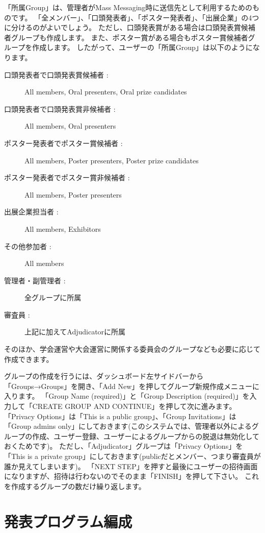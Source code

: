 \documentclass[titlepage,10pt,a4paper,uplatex]{jsbook}
\begin{document}
「所属Group」は、管理者がMass Messaging時に送信先として利用するためのものです。
「全メンバー」、「口頭発表者」、「ポスター発表者」、「出展企業」の4つに分けるのがよいでしょう。
ただし、口頭発表賞がある場合は口頭発表賞候補者グループも作成します。
また、ポスター賞がある場合もポスター賞候補者グループを作成します。
したがって、ユーザーの「所属Group」は以下のようになります。

\begin{description}
\item[口頭発表者で口頭発表賞候補者 : ] All members, Oral presenters, Oral prize candidates
\item[口頭発表者で口頭発表賞非候補者 : ] All members, Oral presenters
\item[ポスター発表者でポスター賞候補者 : ] All members, Poster presenters, Poster prize candidates
\item[ポスター発表者でポスター賞非候補者 : ] All members, Poster presenters
\item[出展企業担当者 : ] All members, Exhibitors
\item[その他参加者 : ] All members
\item[管理者・副管理者 : ] 全グループに所属
\item[審査員 : ] 上記に加えてAdjudicatorに所属
\end{description}

そのほか、学会運営や大会運営に関係する委員会のグループなども必要に応じて作成できます。

グループの作成を行うには、ダッシュボード左サイドバーから「Groups→Groups」を開き、「Add New」を押してグループ新規作成メニューに入ります。
「Group Name (required)」と「Group Description (required)」を入力して「CREATE GROUP AND CONTINUE」を押して次に進みます。
「Privacy Options」は「This is a public group」、「Group Invitations」は「Group admins only」にしておきます(このシステムでは、管理者以外によるグループの作成、ユーザー登録、ユーザーによるグループからの脱退は無効化しておくためです)。
ただし、「Adjudicator」グループは「Privacy Options」を「This is a private group」にしておきます(publicだとメンバー、つまり審査員が誰か見えてしまいます)。
「NEXT STEP」を押すと最後にユーザーの招待画面になりますが、招待は行わないのでそのまま「FINISH」を押して下さい。
これを作成するグループの数だけ繰り返します。

\section{発表プログラム編成}
\end{document}
